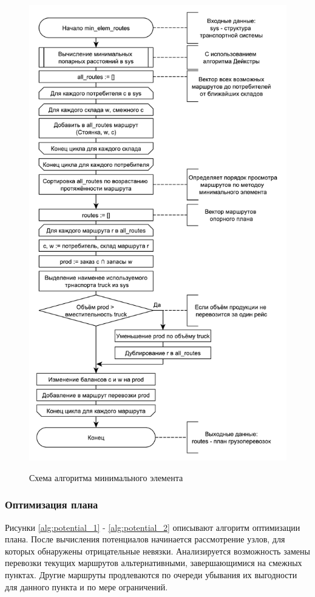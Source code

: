 \begin{figure}[hp]
	\begin{center}
		{\includegraphics[scale=0.7, angle=0, page=1]{img/min_elem_routes.pdf}}
		\caption{Схема алгоритма минимального элемента}
		\label{alg:min_elem}
	\end{center}
\end{figure}

\subsubsection{Оптимизация плана}
Рисунки \ref{alg:potential_1} - \ref{alg:potential_2} описывают алгоритм оптимизации плана. После вычисления потенциалов начинается рассмотрение узлов, для которых обнаружены отрицательные невязки. Анализируется возможность замены перевозки текущих маршрутов альтернативными, завершающимися на смежных пунктах. Другие маршруты продлеваются по очереди убывания их выгодности для данного пункта и по мере ограничений.

